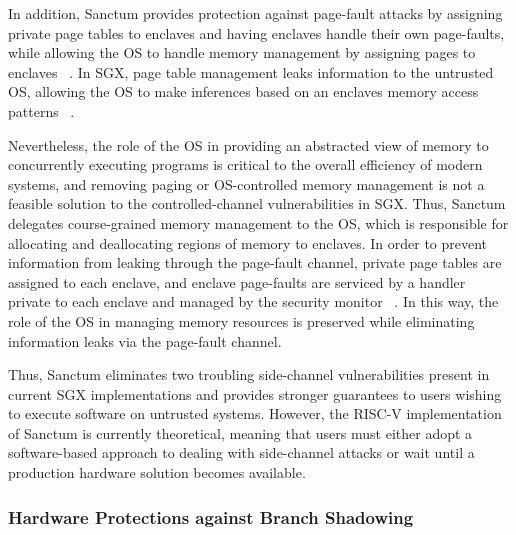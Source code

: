 In addition, Sanctum provides protection against page-fault attacks by assigning private page tables to enclaves and having enclaves handle their own page-faults, while allowing the OS to handle memory management by assigning pages to enclaves ~\cite{costan_sanctum:_2016, costan_sanctum:_2015}. In SGX, page table management leaks information to the untrusted OS, allowing the OS to make inferences based on an enclaves memory access patterns ~\cite{costan_sanctum:_2016, costan_sanctum:_2015, costan_intel_2016}. 

Nevertheless, the role of the OS in providing an abstracted view of memory to concurrently executing programs is critical to the overall efficiency of modern systems, and removing paging or OS-controlled memory management is not a feasible solution to the controlled-channel vulnerabilities in SGX. Thus, Sanctum delegates course-grained memory management to the OS, which is responsible for allocating and deallocating regions of memory to enclaves. In order to prevent information from leaking through the page-fault channel, private page tables are assigned to each enclave, and enclave page-faults are serviced by a handler private to each enclave and managed by the security monitor ~\cite{costan_sanctum:_2016, costan_sanctum:_2015}. In this way, the role of the OS in managing memory resources is preserved while eliminating information leaks via the page-fault channel.

Thus, Sanctum eliminates two troubling side-channel vulnerabilities present in current SGX implementations and provides stronger guarantees to users wishing to execute software on untrusted systems. However, the RISC-V implementation of Sanctum is currently theoretical, meaning that users must either adopt a software-based approach to dealing with side-channel attacks or wait until a production hardware solution becomes available. 

\subsubsection{Hardware Protections against Branch Shadowing}

